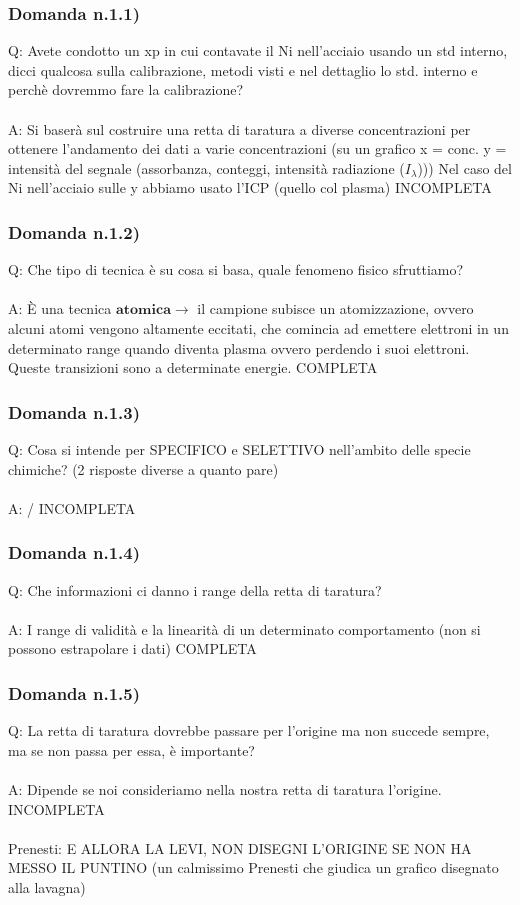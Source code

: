 \documentclass{article}
\begin{document}
\subsubsection{Domanda n.1.1)}
Q: Avete condotto un xp in cui contavate il Ni nell'acciaio usando un std interno, dicci qualcosa sulla calibrazione, metodi visti e nel dettaglio lo std. interno e perchè dovremmo fare la calibrazione?
\\\\
A: Si baserà sul costruire una retta di taratura a diverse concentrazioni per ottenere l'andamento dei dati a varie concentrazioni (su un grafico x = conc. y = intensità del segnale (assorbanza, conteggi, intensità radiazione ($I_{\lambda}$)))
Nel caso del Ni nell'acciaio sulle y abbiamo usato l'ICP (quello col plasma) INCOMPLETA
\subsubsection{Domanda n.1.2)}
Q: Che tipo di tecnica è su cosa si basa, quale fenomeno fisico sfruttiamo?
\\\\
A: È una tecnica $\mathbf{atomica} \rightarrow$ il campione subisce un atomizzazione, ovvero alcuni atomi vengono altamente eccitati, che comincia ad emettere elettroni in un determinato range quando diventa plasma ovvero perdendo i suoi elettroni. Queste transizioni sono a determinate energie. COMPLETA
\subsubsection{Domanda n.1.3)}
Q: Cosa si intende per SPECIFICO e SELETTIVO nell'ambito delle specie chimiche? (2 risposte diverse a quanto pare)
\\\\
A: / INCOMPLETA
\subsubsection{Domanda n.1.4)}
Q: Che informazioni ci danno i range della retta di taratura?
\\\\
A: I range di validità e la linearità di un determinato comportamento (non si possono estrapolare i dati) COMPLETA
\subsubsection{Domanda n.1.5)}
Q: La retta di taratura dovrebbe passare per l'origine ma non succede sempre, ma se non passa per essa, è importante?
\\\\
A: Dipende se noi consideriamo nella nostra retta di taratura l'origine. INCOMPLETA
\\\\
Prenesti: E ALLORA LA LEVI, NON DISEGNI L'ORIGINE SE NON HA MESSO IL PUNTINO (un calmissimo Prenesti che giudica un grafico disegnato alla lavagna)
\end{document}
